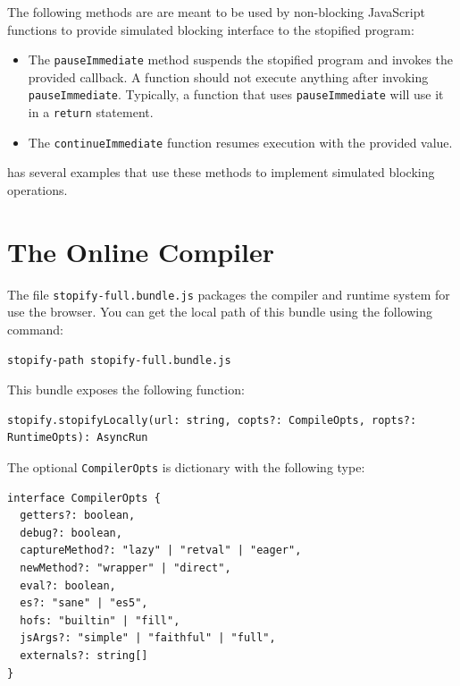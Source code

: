 \documentclass[10pt]{book}
\begin{document}
The following methods are are meant to be used by non-blocking
JavaScript functions to provide simulated blocking interface to the stopified
program:
\begin{itemize}

  \item The \lstinline|pauseImmediate| method suspends the stopified program
  and invokes the provided callback. A function should not execute anything
  after invoking \lstinline|pauseImmediate|. Typically, a function that
  uses \lstinline|pauseImmediate| will use it in a \lstinline|return| statement.

  \item The \lstinline|continueImmediate| function resumes execution with
  the provided value.

\end{itemize}

 has several examples that use these methods
to implement simulated blocking operations.

\section{The Online Compiler}
\lstset{language=console}

The file \lstinline|stopify-full.bundle.js| packages the compiler and runtime
system for use the browser. You can get the local path of this bundle using the
following command:
\lstset{language=console}
\begin{lstlisting}
stopify-path stopify-full.bundle.js
\end{lstlisting}

This bundle exposes the following function:

\lstset{language=js}
\begin{lstlisting}
stopify.stopifyLocally(url: string, copts?: CompileOpts, ropts?: RuntimeOpts): AsyncRun
\end{lstlisting}

The optional \lstinline|CompilerOpts| is dictionary with the following type:

\begin{lstlisting}
interface CompilerOpts {
  getters?: boolean,
  debug?: boolean,
  captureMethod?: "lazy" | "retval" | "eager",
  newMethod?: "wrapper" | "direct",
  eval?: boolean,
  es?: "sane" | "es5",
  hofs: "builtin" | "fill",
  jsArgs?: "simple" | "faithful" | "full",
  externals?: string[]
}
\end{lstlisting}
\end{document}
